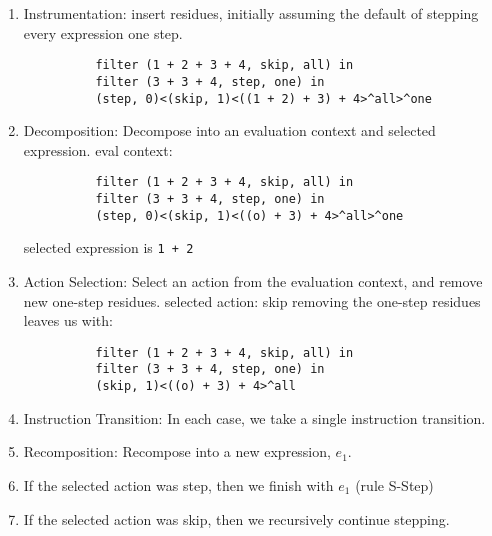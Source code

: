 \begin{enumerate}
    \item Instrumentation: insert residues, initially assuming the default of stepping every expression one step.
        \begin{lstlisting}
          filter (1 + 2 + 3 + 4, skip, all) in
          filter (3 + 3 + 4, step, one) in 
          (step, 0)<(skip, 1)<((1 + 2) + 3) + 4>^all>^one
        \end{lstlisting}
    \item Decomposition: Decompose into an evaluation context and selected expression.
       eval context: 
       \begin{lstlisting}
          filter (1 + 2 + 3 + 4, skip, all) in
          filter (3 + 3 + 4, step, one) in 
          (step, 0)<(skip, 1)<((o) + 3) + 4>^all>^one
        \end{lstlisting}
        selected expression is \lstinline{1 + 2}
    \item Action Selection: Select an action from the evaluation context, and remove new one-step residues. 
        selected action: skip
        removing the one-step residues leaves us with:
        \begin{lstlisting}
          filter (1 + 2 + 3 + 4, skip, all) in
          filter (3 + 3 + 4, step, one) in 
          (skip, 1)<((o) + 3) + 4>^all
        \end{lstlisting}
    \item Instruction Transition: In each case, we take a single instruction transition.
    \item Recomposition: Recompose into a new expression, $e_1$.
    \item If the selected action was step, then we finish with $e_1$ (rule S-Step)
    \item If the selected action was skip, then we recursively continue stepping.
\end{enumerate}



